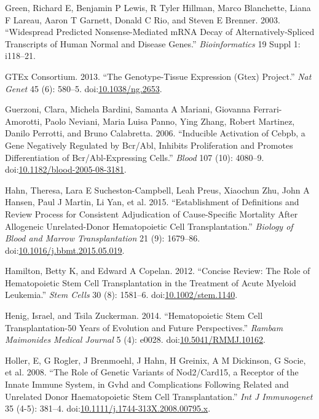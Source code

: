 \documentclass[]{DissertateOSU}
\begin{document}
\hypertarget{ref-green_2003}{}
Green, Richard E, Benjamin P Lewis, R Tyler Hillman, Marco Blanchette,
Liana F Lareau, Aaron T Garnett, Donald C Rio, and Steven E Brenner.
2003. ``Widespread Predicted Nonsense-Mediated mRNA Decay of
Alternatively-Spliced Transcripts of Human Normal and Disease Genes.''
\emph{Bioinformatics} 19 Suppl 1: i118--21.

\hypertarget{ref-gtex}{}
GTEx Consortium. 2013. ``The Genotype-Tissue Expression (Gtex)
Project.'' \emph{Nat Genet} 45 (6): 580--5.
doi:\href{https://doi.org/10.1038/ng.2653}{10.1038/ng.2653}.

\hypertarget{ref-Guerzoni_2006}{}
Guerzoni, Clara, Michela Bardini, Samanta A Mariani, Giovanna
Ferrari-Amorotti, Paolo Neviani, Maria Luisa Panno, Ying Zhang, Robert
Martinez, Danilo Perrotti, and Bruno Calabretta. 2006. ``Inducible
Activation of Cebpb, a Gene Negatively Regulated by Bcr/Abl, Inhibits
Proliferation and Promotes Differentiation of Bcr/Abl-Expressing
Cells.'' \emph{Blood} 107 (10): 4080--9.
doi:\href{https://doi.org/10.1182/blood-2005-08-3181}{10.1182/blood-2005-08-3181}.

\hypertarget{ref-Hahn_2015}{}
Hahn, Theresa, Lara E Sucheston-Campbell, Leah Preus, Xiaochun Zhu, John
A Hansen, Paul J Martin, Li Yan, et al. 2015. ``Establishment of
Definitions and Review Process for Consistent Adjudication of
Cause-Specific Mortality After Allogeneic Unrelated-Donor Hematopoietic
Cell Transplantation.'' \emph{Biology of Blood and Marrow
Transplantation} 21 (9): 1679--86.
doi:\href{https://doi.org/10.1016/j.bbmt.2015.05.019}{10.1016/j.bbmt.2015.05.019}.

\hypertarget{ref-hamilton_2012}{}
Hamilton, Betty K, and Edward A Copelan. 2012. ``Concise Review: The
Role of Hematopoietic Stem Cell Transplantation in the Treatment of
Acute Myeloid Leukemia.'' \emph{Stem Cells} 30 (8): 1581--6.
doi:\href{https://doi.org/10.1002/stem.1140}{10.1002/stem.1140}.

\hypertarget{ref-Henig_2014}{}
Henig, Israel, and Tsila Zuckerman. 2014. ``Hematopoietic Stem Cell
Transplantation-50 Years of Evolution and Future Perspectives.''
\emph{Rambam Maimonides Medical Journal} 5 (4): e0028.
doi:\href{https://doi.org/10.5041/RMMJ.10162}{10.5041/RMMJ.10162}.

\hypertarget{ref-holler_2008}{}
Holler, E, G Rogler, J Brenmoehl, J Hahn, H Greinix, A M Dickinson, G
Socie, et al. 2008. ``The Role of Genetic Variants of Nod2/Card15, a
Receptor of the Innate Immune System, in Gvhd and Complications
Following Related and Unrelated Donor Haematopoietic Stem Cell
Transplantation.'' \emph{Int J Immunogenet} 35 (4-5): 381--4.
doi:\href{https://doi.org/10.1111/j.1744-313X.2008.00795.x}{10.1111/j.1744-313X.2008.00795.x}.
\end{document}
